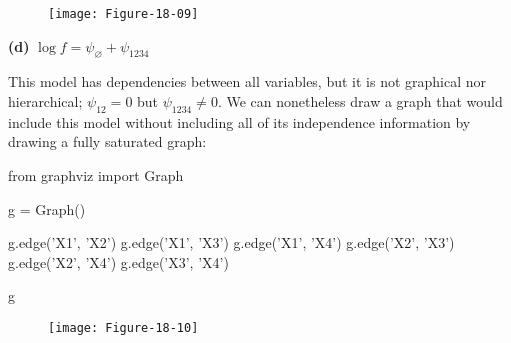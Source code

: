 \begin{figure}[H]
\centering
\texttt{[image: Figure-18-09]}
\end{figure}

\textbf{(d)} \(\log f = \psi_\varnothing + \psi_{1234}\)

This model has dependencies between all variables, but it is not
graphical nor hierarchical; \(\psi_{12} = 0\) but
\(\psi_{1234} \neq 0\). We can nonetheless draw a graph that would
include this model without including all of its independence information
by drawing a fully saturated graph:

\begin{python}
from graphviz import Graph

g = Graph()

g.edge('X1', 'X2')
g.edge('X1', 'X3')
g.edge('X1', 'X4')
g.edge('X2', 'X3')
g.edge('X2', 'X4')
g.edge('X3', 'X4')

g
\end{python}

\begin{figure}[H]
\centering
\texttt{[image: Figure-18-10]}
\end{figure}

